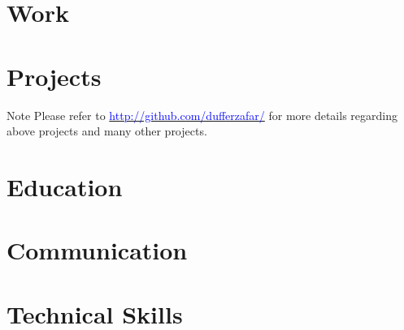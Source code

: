 \documentclass[12pt, a4paper, sans]{moderncv}
\begin{document}
\maketitle

\vspace{0.5cm}
\section{Work}

    

\section{Projects}

    

\vspace{0.75cm}
\cventry{}
    {Note}
    {}
    {}
    {}
    {
        Please refer to \href{http://github.com/dufferzafar/}{\textcolor{blue}{http://github.com/dufferzafar/}}
        for more details regarding above projects and many other projects.
    }

\pagebreak

\section{Education}

    

\section{Communication}

    

\section{Technical Skills}

    
\end{document}
